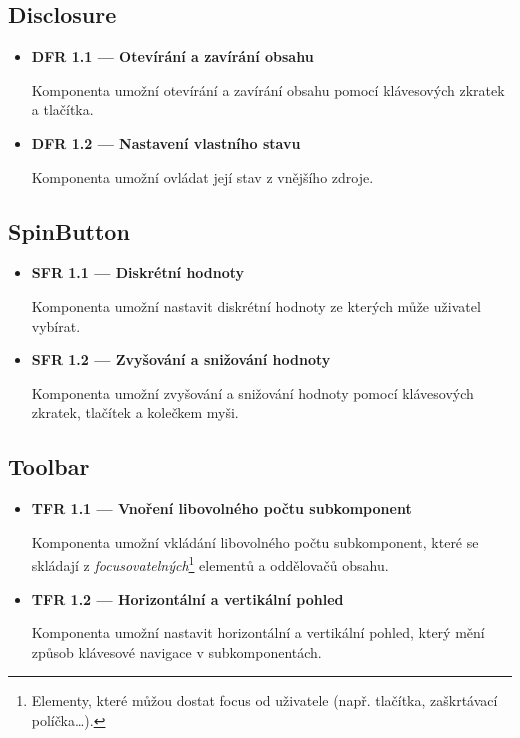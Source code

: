 \subsection{Disclosure}

\begin{itemize}
      \item \textbf{DFR 1.1 --- Otevírání a zavírání obsahu}\label{dfr11}

            Komponenta umožní otevírání a zavírání obsahu pomocí klávesových zkratek a tlačítka.

      \item \textbf{DFR 1.2 --- Nastavení vlastního stavu}\label{dfr12}

            Komponenta umožní ovládat její stav z vnějšího zdroje.
\end{itemize}

\subsection{SpinButton}

\begin{itemize}
      \item \textbf{SFR 1.1 --- Diskrétní hodnoty}

            Komponenta umožní nastavit diskrétní hodnoty ze kterých může uživatel vybírat.

      \item \textbf{SFR 1.2 --- Zvyšování a snižování hodnoty}\label{sfr12}

            Komponenta umožní zvyšování a snižování hodnoty pomocí klávesových zkratek, tlačítek a kolečkem myši.
\end{itemize}

\subsection{Toolbar}

\begin{itemize}
      \item \textbf{TFR 1.1 --- Vnoření libovolného počtu subkomponent}\label{tfr11}

            Komponenta umožní vkládání libovolného počtu subkomponent, které se skládají z \textit{focusovatelných}\footnote{Elementy, které můžou dostat focus od uživatele (např. tlačítka, zaškrtávací políčka\dots).} elementů a oddělovačů obsahu.

      \item \textbf{TFR 1.2 --- Horizontální a vertikální pohled}\label{tfr12}

            Komponenta umožní nastavit horizontální a vertikální pohled, který mění způsob klávesové navigace v subkomponentách.
\end{itemize}

